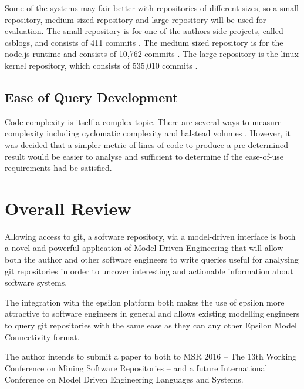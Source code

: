 \documentclass[11pt]{book}
\begin{document}
Some of the systems may fair better with repositories of different sizes, so a small repository, medium sized repository and large repository will be used for evaluation. The small repository is for one of the authors side projects, called csblogs, and consists of 411 commits \cite{csbrepository}. The medium sized repository is for the node.js runtime and consists of 10,762 commits \cite{noderepository}. The large repository is the linux kernel repository, which consists of 535,010 commits \cite{linuxrepository}.

 


\subsection{Ease of Query Development}
Code complexity is itself a complex topic. There are several ways to measure complexity including cyclomatic complexity and halstead volumes \cite{halstead}. However, it was decided that a simpler metric of lines of code to produce a pre-determined result would be easier to analyse and sufficient to determine if the ease-of-use requirements had be satisfied.


\section{Overall Review}
Allowing access to git, a software repository, via a model-driven interface is both a novel and powerful application of Model Driven Engineering that will allow both the author and other software engineers to write queries useful for analysing git repositories in order to uncover interesting and actionable information about software systems.

The integration with the epsilon platform both makes the use of epsilon more attractive to software engineers in general and allows existing modelling engineers to query git repositories with the same ease as they can any other Epsilon Model Connectivity format.

The author intends to submit a paper to both to MSR 2016 -- The 13th Working Conference on Mining Software Repositories \cite{msr2016} -- and a future International Conference on Model Driven Engineering Languages and Systems.

\end{document}
